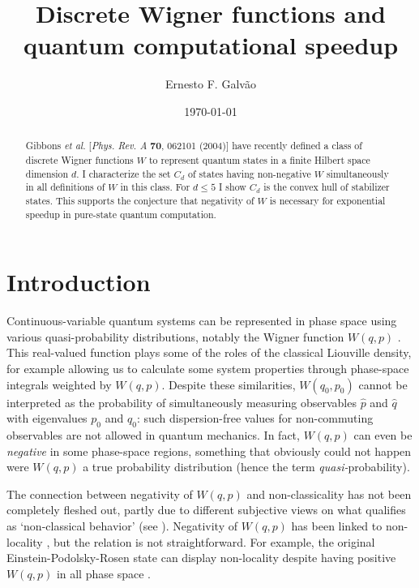 \documentclass[aps,twocolumn,showpacs,nofootinbib,groupedaddress]{revtex4}
\begin{document}
\title{Discrete Wigner functions and quantum computational speedup}

\author{Ernesto F. Galv\~{a}o}

\begin{abstract}
Gibbons \textit{et al.} [\textit{Phys. Rev. A} \textbf{70}, 062101
(2004)] have recently defined a class of discrete Wigner functions
$W$ to represent quantum states in a finite Hilbert space
dimension $d$. I characterize the set $C_d$ of states having
non-negative $W$ simultaneously in all definitions of $W$ in this
class. For $d\le5$ I show $C_d$ is the convex hull of stabilizer
states. This supports the conjecture that negativity of $W$ is
necessary for exponential speedup in pure-state quantum
computation.
\end{abstract}
\date{\today}
 \maketitle

\section{Introduction}

Continuous-variable quantum systems can be represented in phase
space using various quasi-probability distributions, notably the
Wigner function $W(q,p)$ \cite{Wigner32,HillaryOSW84}. This
real-valued function plays some of the roles of the classical
Liouville density, for example allowing us to calculate some
system properties through phase-space integrals weighted by
$W(q,p)$. Despite these similarities, $W(q_0,p_0)$ cannot be
interpreted as the probability of simultaneously measuring
observables $\hat{p}$ and $\hat{q}$ with eigenvalues $p_0$ and
$q_0$: such dispersion-free values for non-commuting observables
are not allowed in quantum mechanics. In fact, $W(q,p)$ can even
be \textit{negative} in some phase-space regions, something that
obviously could not happen were $W(q,p)$ a true probability
distribution (hence the term \textit{quasi-}probability).

The connection between negativity of $W(q,p)$ and non-classicality
has not been completely fleshed out, partly due to different
subjective views on what qualifies as `non-classical behavior' (see \cite{Hudson74,BuzekV-DK92}).
Negativity of $W(q,p)$ has been linked to non-locality
\cite{Bell86}, but the relation is not straightforward. For
example, the original Einstein-Podolsky-Rosen state can display
non-locality despite having positive $W(q,p)$ in all phase space
\cite{Cohen97,BanaszekW98,BanaszekW98b}.
\end{document}
